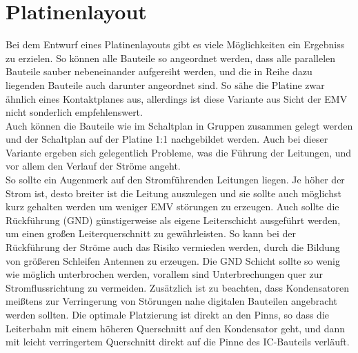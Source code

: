 \section{Platinenlayout}
Bei dem Entwurf eines Platinenlayouts gibt es viele Möglichkeiten ein Ergebniss zu erzielen. So können alle Bauteile so angeordnet werden, dass alle parallelen Bauteile sauber nebeneinander aufgereiht werden, und die in Reihe dazu liegenden Bauteile auch darunter angeordnet sind. So sähe die Platine zwar ähnlich eines Kontaktplanes aus, allerdings ist diese Variante aus Sicht der EMV nicht sonderlich empfehlenswert.\\
Auch können die Bauteile wie im Schaltplan in Gruppen zusammen gelegt werden und der Schaltplan auf der Platine 1:1 nachgebildet werden. Auch bei dieser Variante ergeben sich gelegentlich Probleme, was die Führung der Leitungen, und vor allem den Verlauf der Ströme angeht.\\
So sollte ein Augenmerk auf den Stromführenden Leitungen liegen. Je höher der Strom ist, desto breiter ist die Leitung auszulegen und sie sollte auch möglichst kurz gehalten werden um weniger EMV störungen zu erzeugen. Auch sollte die Rückführung (GND) günstigerweise als eigene Leiterschicht ausgeführt werden, um einen großen Leiterquerschnitt zu gewährleisten. So kann bei der Rückführung der Ströme auch das Risiko vermieden werden, durch die Bildung von größeren Schleifen Antennen zu erzeugen. Die GND Schicht sollte so wenig wie möglich unterbrochen werden, vorallem sind Unterbrechungen quer zur Stromflussrichtung zu vermeiden. Zusätzlich ist zu beachten, dass Kondensatoren meißtens zur Verringerung von Störungen nahe digitalen Bauteilen angebracht werden sollten. Die optimale Platzierung ist direkt an den Pinns, so dass die Leiterbahn mit einem höheren Querschnitt auf den Kondensator geht, und dann mit leicht verringertem Querschnitt direkt auf die Pinne des IC-Bauteils verläuft.


